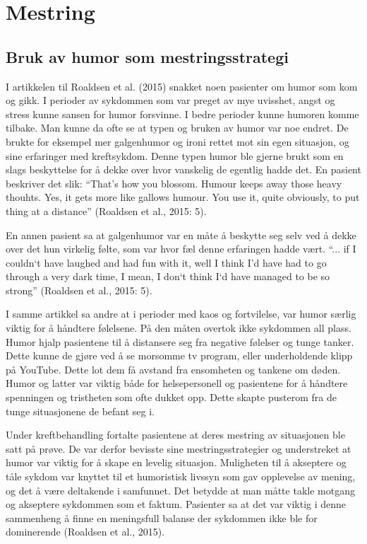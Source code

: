 \section{Mestring}

\subsection{Bruk av humor som mestringsstrategi}

I artikkelen til Roaldsen et al. (2015) snakket noen pasienter om humor som kom
og gikk. I perioder av sykdommen som var preget av mye uvisshet, angst og
stress kunne sansen for humor forsvinne. I bedre perioder kunne humoren komme
tilbake. Man kunne da ofte se at typen og bruken av humor var noe endret. De
brukte for eksempel mer galgenhumor og ironi rettet mot sin egen situasjon, og
sine erfaringer med kreftsykdom. Denne typen humor ble gjerne brukt som en
slags beskyttelse for å dekke over hvor vanskelig de egentlig hadde det. En
pasient beskriver det slik: “That’s how you blossom. Humour keeps away those
heavy thouhts. Yes, it gets more like gallows humour. You use it, quite
obviously, to put thing at a distance” (Roaldsen et al., 2015: 5).

En annen pasient sa at galgenhumor var en måte å beskytte seg selv ved å dekke
over det hun virkelig følte, som var hvor fæl denne erfaringen hadde vært. “...
if I couldn`t have laughed and had fun with it, well I think I’d have had to go
through a very dark time, I mean, I don`t think I`d have managed to be so
strong” (Roaldsen et al., 2015: 5).

I samme artikkel sa andre at i perioder med kaos og fortvilelse, var humor
særlig viktig for å håndtere følelsene. På den måten overtok ikke sykdommen all
plass. Humor hjalp pasientene til å distansere seg fra negative følelser og
tunge tanker. Dette kunne de gjøre ved å se morsomme tv program, eller
underholdende klipp på YouTube. Dette lot dem få avstand fra ensomheten og
tankene om døden. Humor og latter var viktig både for helsepersonell og
pasientene for å håndtere spenningen og tristheten som ofte dukket opp. Dette
skapte pusterom fra de tunge situasjonene de befant seg i.

Under kreftbehandling fortalte pasientene at deres mestring av situasjonen ble
satt på prøve. De var derfor bevisste sine mestringsstrategier og understreket
at humor var viktig for å skape en levelig situasjon. Muligheten til å
akseptere og tåle sykdom var knyttet til et humoristisk livssyn som gav
opplevelse av mening, og det å være deltakende i samfunnet. Det betydde at man
måtte takle motgang og akseptere sykdommen som et faktum. Pasienter sa at det
var viktig i denne sammenheng å finne en meningsfull balanse der sykdommen ikke
ble for dominerende (Roaldsen et al., 2015).

